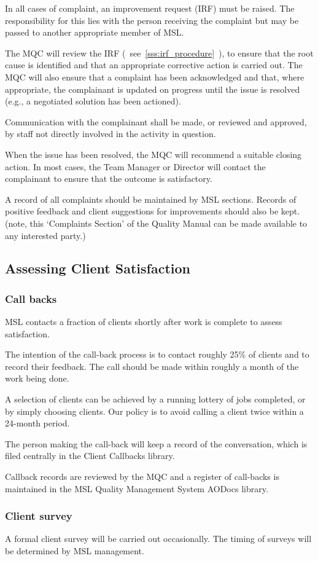 In all cases of complaint, an improvement request (IRF) must be raised. The responsibility for this lies with the person receiving the complaint but may be passed to another appropriate member of MSL.

The MQC will review the IRF (~see~\ref{sss:irf_procedure}~), to ensure that the root cause is identified and that an appropriate corrective action is carried out.  
The MQC will also ensure that a complaint has been acknowledged and that, where appropriate, the complainant is updated on progress until the issue is resolved (e.g., a negotiated solution has been actioned). 

Communication with the complainant shall be made, or reviewed and approved, by staff not directly involved in the activity in question.

When the issue has been resolved, the MQC will recommend a suitable closing action. In most cases, the Team Manager or Director will contact the complainant to ensure that the outcome is satisfactory. 

A record of all complaints should be maintained by MSL sections. Records of positive feedback and client suggestions for improvements should also be kept.
(note, this `Complaints Section' of the Quality Manual can be made available to any interested party.)

\subsection{Assessing Client Satisfaction}
\label{ss:client_satisfaction}
\subsubsection{Call backs}
MSL contacts a fraction of clients shortly after work is complete to assess satisfaction.

The intention of the call-back process is to contact roughly 25\% of clients and to record their feedback. The call should be made within roughly a month of the work being done.

A selection of clients can be achieved by a running lottery of jobs completed, or by simply choosing clients. Our policy is to avoid calling a client twice within a 24-month period.

The person making the call-back will keep a record of the conversation, which is filed centrally in the Client Callbacks library. 

Callback records are reviewed by the MQC and a register of call-backs is maintained in the MSL Quality Management System AODocs library.

\subsubsection{Client survey}
A formal client survey will be carried out occasionally. The timing of surveys will be determined by MSL management.